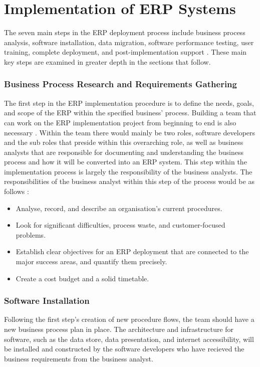 \section{Implementation of ERP Systems}
\par{The seven main steps in the ERP deployment process include business process analysis, software installation, data migration, software performance testing, user training, complete deployment, and post-implementation support \citep{ly2020definitive}. These main key steps are examined in greater depth in the sections that follow.}
\subsubsection{Business Process Research and Requirements Gathering}
\par{The first step in the ERP implementation procedure is to define the needs, goals, and scope of the ERP within the specified business' process. Building a team that can work on the ERP implementation project from beginning to end is also necessary \citep{wetherbe2006information}. Within the team there would mainly be two roles, software developers and the sub roles that preside within this overarching role, as well as business analysts that are responsible for documenting and understanding the business process and how it will be converted into an ERP system. This step within the implementation process is largely the responsibility of the business analysts. The responsibilities of the business analyst within this step of the process would be as follows \citep{yusuf2004enterprise}:}
\begin{itemize}
    \item Analyse, record, and describe an organisation's current procedures. 
    \item Look for significant difficulties, process waste, and customer-focused problems.
    \item Establish clear objectives for an ERP deployment that are connected to the major success areas, and quantify them precisely.
    \item Create a cost budget and a solid timetable.
\end{itemize}
\subsubsection{Software Installation}
\par{Following the first step's creation of new procedure flows, the team should have a new business process plan in place. The architecture and infrastructure for software, such as the data store, data presentation, and internet accessibility, will be installed and constructed by the software developers who have recieved the business requirements from the business analyst.}
